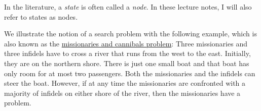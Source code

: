 \remark
In the literature, a \emph{\color{blue}state} is often called a \emph{\color{blue}node}.  In these lecture
notes, I will also refer to states as nodes.  \eoxs

\example
We illustrate the notion of a search problem with the following example, which is also known as the 
\href{https://en.wikipedia.org/wiki/Missionaries_and_cannibals_problem}{missionaries and cannibals problem}: 
Three missionaries and three infidels have to cross a river that runs from the west to the east.
Initially, they are on the northern shore.  There is just one small boat and that boat has only room
for at most two passengers.  Both the missionaries and the infidels can steer the boat.  However, if
at any time the missionaries are confronted with a majority of infidels on either shore of the
river, then the missionaries have a problem.  

